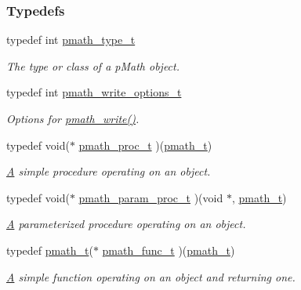 \subsubsection*{Typedefs}
\begin{CompactItemize}
\item 
typedef int \hyperlink{group__objects_ge2646df76dcb0113715322b13a1f36f0}{pmath\_\-type\_\-t}
\begin{CompactList}\small\item\em The type or class of a pMath object. \item\end{CompactList}\item 
typedef int \hyperlink{group__objects_gd83ea6a616c49cbe35b5d3dafb877f7e}{pmath\_\-write\_\-options\_\-t}
\begin{CompactList}\small\item\em Options for \hyperlink{group__objects_g9f909b9eb04317260ee8630d10e5a7c6}{pmath\_\-write()}. \item\end{CompactList}\item 
typedef void($\ast$ \hyperlink{group__objects_g6c56c2d026f4cc8603a217291a8a35fb}{pmath\_\-proc\_\-t} )(\hyperlink{classpmath__t}{pmath\_\-t})
\begin{CompactList}\small\item\em \hyperlink{class_a}{A} simple procedure operating on an object. \item\end{CompactList}\item 
typedef void($\ast$ \hyperlink{group__objects_g3ae604b25e05979c1e7ff48524636b3e}{pmath\_\-param\_\-proc\_\-t} )(void $\ast$, \hyperlink{classpmath__t}{pmath\_\-t})
\begin{CompactList}\small\item\em \hyperlink{class_a}{A} parameterized procedure operating on an object. \item\end{CompactList}\item 
typedef \hyperlink{classpmath__t}{pmath\_\-t}($\ast$ \hyperlink{group__objects_g9dd57b578f42f0556a7d1c1709f97847}{pmath\_\-func\_\-t} )(\hyperlink{classpmath__t}{pmath\_\-t})
\begin{CompactList}\small\item\em \hyperlink{class_a}{A} simple function operating on an object and returning one. \item\end{CompactList}\item 

\end{CompactItemize}
